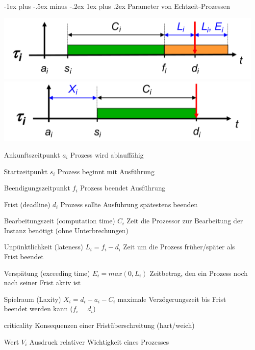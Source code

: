 \documentclass[a4paper]{article}
\makeatletter
\renewcommand{\subsubsection}{\@startsection{subsubsection}{3}{0mm}%
 {-1ex plus -.5ex minus -.2ex}%
 {1ex plus .2ex}%
 {\normalfont\small\bfseries}}
\makeatother
\begin{document}
\begin{multicols}{3}
    \subsubsection{Parameter von Echtzeit-Prozessen}
    \begin{center}
        \includegraphics[width=.45\linewidth]{Assets/AdvancedOperatingSystems-echtzeit-parameter-instanz2.png}
        \includegraphics[width=.45\linewidth]{Assets/AdvancedOperatingSystems-echtzeit-parameter-instanz3.png}
    \end{center}
    \begin{description*}
        \item[Ankunftszeitpunkt $a_i$] Prozess wird ablauffähig
        \item[Startzeitpunkt $s_i$] Prozess beginnt mit Ausführung
        \item[Beendigungszeitpunkt $f_i$] Prozess beendet Ausführung
        \item[Frist (deadline) $d_i$] Prozess sollte Ausführung spätestens beenden
        \item[Bearbeitungszeit (computation time) $C_i$] Zeit die Prozessor zur Bearbeitung der Instanz benötigt (ohne Unterbrechungen)
        \item[Unpünktlichkeit (lateness)] $L_i= f_i - d_i$ Zeit um die Prozess früher/später als Frist beendet
        \item[Verspätung (exceeding time)] $E_i= max(0, L_i)$ Zeitbetrag, den ein Prozess noch nach seiner Frist aktiv ist
        \item[Spielraum (Laxity)] $X_i = d_i - a_i - C_i$ maximale Verzögerungszeit bis Frist beendet werden kann ($f_i=d_i$)
        \item[criticality] Konsequenzen einer Fristüberschreitung (hart/weich)
        \item[Wert $V_i$] Ausdruck relativer Wichtigkeit eines Prozesses
    \end{description*}


\end{multicols}
\end{document}
